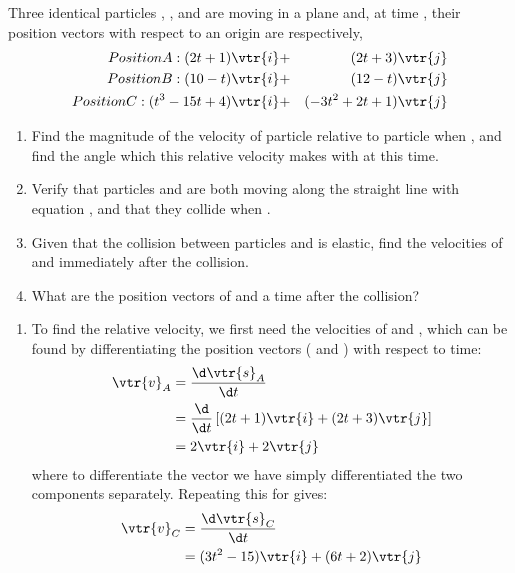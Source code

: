 
\begin{problem}[A1988FMIVQ1a] %
{Three identical particles , , and  are moving in a plane and, at time , their position vectors with respect to an origin  are respectively,
\begin{eqnarray*} 
Position A: (2t +1)\vtr{i} &+& (2t+ 3)\vtr{j}  \\ 
Position B: (10 - t)\vtr{i} &+& (12 - t)\vtr{j} \\ 
Position C: (t^{3} - 15t + 4)\vtr{i} &+& (-3t^{2} + 2t + 1)\vtr{j} 
\end{eqnarray*} 

\begin{enumerate}
	\item Find the magnitude of the velocity of particle  relative to particle  when , and find the angle which this relative velocity makes with  at this time.
	\item Verify that particles  and  are both moving along the straight line with equation , and that they collide when .
	\item Given that the collision between particles  and  is elastic, find the velocities of  and  immediately after the collision.
	\item What are the position vectors of  and  a time \vari{\tau} after the collision?
\end{enumerate}
}
{}
{
\begin{enumerate}
	\item To find the relative velocity, we first need the velocities of  and , which can be found by differentiating the position vectors ( and ) with respect to time:
\begin{eqnarray*} 
\vtr{v}_{A} &= \frac{\d \vtr{s}_{A}}{\d t} \\ 
&= \frac{\d}{\d t}\left[(2t + 1)\vtr{i} + (2t + 3)\vtr{j}\right] \\ 
&= 2\vtr{i} + 2\vtr{j} 
\end{eqnarray*}
where to differentiate the vector we have simply differentiated the two components separately. Repeating this for   gives:
\begin{eqnarray*} 
\vtr{v}_{C} & = \frac{\d \vtr{s}_{C}}{\d t} \\ 
&= (3t^{2} - 15)\vtr{i} + (6t + 2)\vtr{j} 
\end{eqnarray*}


\end{enumerate}}
\end{problem}
